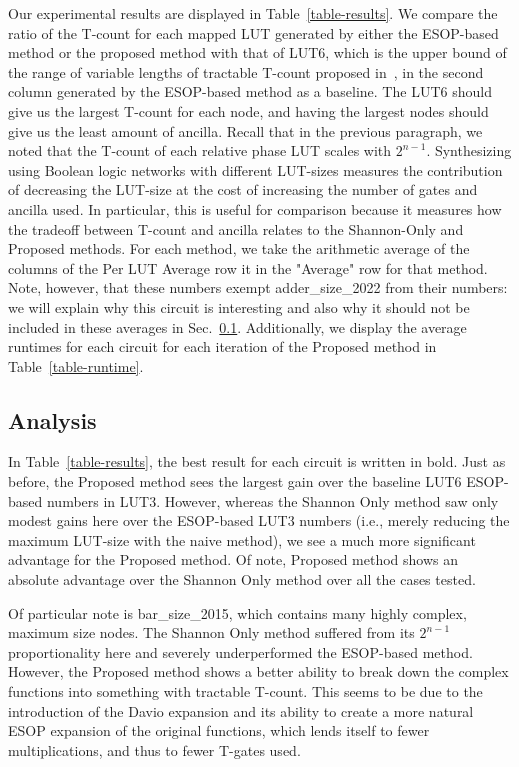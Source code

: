 Our experimental results are displayed in Table~\ref{table-results}. We compare the ratio of the T-count for
each mapped LUT generated by either the ESOP-based method or the proposed method with that of LUT6, which is
the upper bound of the range of variable lengths of tractable T-count proposed in~\cite{bib-barenco-elementary},
in the second column generated by the ESOP-based method as a baseline. The LUT6 should give us the
largest T-count for each node, and having the largest nodes should give us the least amount of ancilla. Recall that
in the previous paragraph, we noted that the T-count of each
relative phase LUT scales with $2^{n-1}$. Synthesizing using Boolean logic networks with different LUT-sizes
measures the contribution of decreasing the LUT-size at the cost of
increasing the number of gates and ancilla used. In particular, this is useful for comparison because it measures
how the tradeoff between T-count and ancilla relates to the Shannon-Only and Proposed methods.  For each method, we take the arithmetic average of the columns of the Per LUT
Average row it in the "Average" row for that method. Note, however, that these numbers exempt adder\_size\_2022
from their numbers: we will explain why this circuit is interesting and also why it should not be included in these
averages in Sec.~\ref{Subsec:Analysis}. Additionally, we display the average runtimes for each circuit for each
iteration of the Proposed method in Table~\ref{table-runtime}.

\subsection{Analysis}
\label{Subsec:Analysis}
In Table~\ref{table-results}, the best result for each circuit is written in bold. Just as before, the
Proposed method sees the largest gain over the baseline LUT6 ESOP-based numbers in LUT3. However, whereas
the Shannon Only method saw only modest gains here over the ESOP-based LUT3 numbers (i.e., merely reducing the
maximum LUT-size with the naive method), we see a much more significant advantage for the Proposed method.
Of note, Proposed method shows an absolute advantage over the Shannon Only method over all the cases tested.

Of particular note is bar\_size\_2015, which contains many highly complex, maximum size nodes. The Shannon Only
method suffered from its $2^{n-1}$ proportionality here and severely underperformed the ESOP-based method.
However, the Proposed method shows a better ability to break down the complex functions into something
with tractable T-count. This seems to be due to the introduction of the Davio expansion and its ability
to create a more natural ESOP expansion of the original functions, which lends itself to fewer multiplications, and thus to fewer T-gates used.

